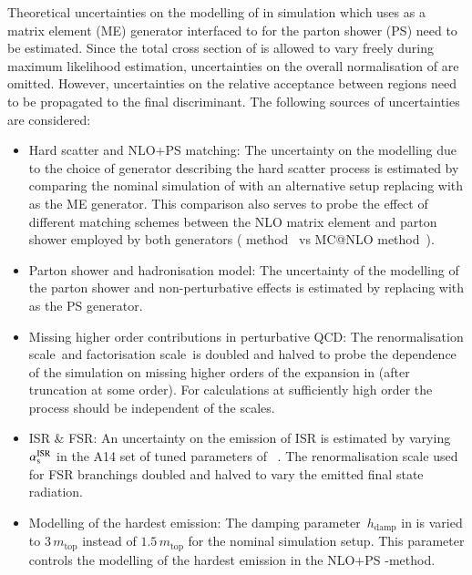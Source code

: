 Theoretical uncertainties on the modelling of \ttbar in simulation
which uses \POWHEGBOX[v2] as a matrix element (ME) generator
interfaced to \PYTHIA[8.230] for the parton shower (PS) need to be
estimated. Since the total cross section of \ttbar is allowed to vary
freely during maximum likelihood estimation, uncertainties on the
overall normalisation of \ttbar are omitted. However, uncertainties on
the relative acceptance between regions need to be propagated to the
final discriminant. The following sources of
uncertainties are considered:
\begin{itemize}

\item Hard scatter and NLO+PS matching: The uncertainty on the
  modelling due to the choice of generator describing the hard scatter
  process is estimated by comparing the nominal simulation of \ttbar
  with an alternative setup replacing \POWHEGBOX with \MGNLO as the ME
  generator. This comparison also serves to probe the effect of
  different matching schemes between the NLO matrix element and parton
  shower employed by both generators (\POWHEG
  method~\cite{Nason:2004rx,Frixione:2007vw,Alioli:2010xd} vs MC@NLO
  method~\cite{Frixione:2002ik}).

\item Parton shower and hadronisation model: The uncertainty of the
  modelling of the parton shower and non-perturbative effects is
  estimated by replacing \PYTHIA with \HERWIG as the PS generator.

\item Missing higher order contributions in perturbative QCD: The
  renormalisation scale~\muR and factorisation scale~\muF is doubled
  and halved to probe the dependence of the simulation on missing
  higher orders of the expansion in \alphas (after truncation at some
  order). For calculations at sufficiently high order the process
  should be independent of the scales.

\item ISR \& FSR: An uncertainty on the emission of
  ISR is estimated by varying $\alpha_{\text{s}}^\text{ISR}$ in the A14 set of
  tuned parameters of \PYTHIA[8]~\cite{ATL-PHYS-PUB-2014-021}.
  The renormalisation scale used for FSR branchings doubled and halved
  to vary the emitted final state radiation.

\item Modelling of the hardest emission: The damping
  parameter~$h_\text{damp}$ in \POWHEGBOX[v2] is varied to
  $3 \, m_\text{top}$ instead of $1.5 \, m_\text{top}$ for the nominal
  simulation setup. This parameter controls the modelling of the
  hardest emission in the NLO+PS \POWHEG-method.
\end{itemize}

